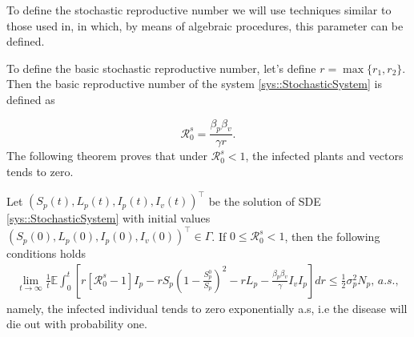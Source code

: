 To define the stochastic reproductive number we will use techniques similar to
those used in\cite{Agarwal2019}, in which, by means of algebraic procedures,
this parameter can be defined. 

To define the basic stochastic reproductive number, let's define 
$ r = \max \{r_1, r_2 \}$. 
Then the basic reproductive number of the system \autoref{sys::StochasticSystem}
is defined as

\begin{equation}\label{eqn::StochasticBRN}
	\mathcal{R}_0 ^ s =
		\frac{\beta_p \beta_v}{\gamma r}.
\end{equation}
%
The following theorem proves that under $\mathcal{R}^s_0<1$, the infected plants
and vectors tends to zero.
\begin{theorem}
	\label{thm::Rs0Extinction}
	Let $(S_p(t),L_p(t),I_p(t),I_v(t))^\top$ 
	be the solution of SDE \autoref{sys::StochasticSystem} with initial values 
	$
		(S_p(0),L_p(0),I_p(0),I_v(0))^\top \in \Gamma
	$. 
	If $0\leq \mathcal{R}^s_0<1$, 
	then the following conditions holds
	\begin{align*}
		\lim
		\limits_{t\to \infty}
		\frac{1}{t}
		\mathbb{E}
		\int_{0}^{t}
			\left[
				r
				[\mathcal{R}^s_0 - 1]
				I_p - r S_p
				\left(
					1 - \frac{S^0_p}{S_p}
				\right) ^ 2 - 
				r L_p - 
				\frac{\beta_p\beta_v}{\gamma} 
				I_v I_p
			\right] dr 
			\leq \frac{1}{2} \sigma_p^ 2 N_p,\, a.s.,
	\end{align*}
	namely, the infected individual tends to zero exponentially a.s, i.e the 
	disease will die out with probability one.
\end{theorem}
%

